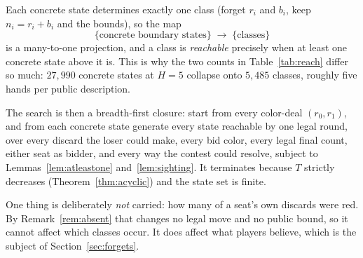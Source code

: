 \documentclass[11pt]{article}
\theoremstyle{plain}
\theoremstyle{definition}
\theoremstyle{remark}
\begin{document}
Each concrete state determines exactly one class (forget $r_i$ and $b_i$,
keep $n_i=r_i+b_i$ and the bounds), so the map
\[
  \{\text{concrete boundary states}\}\;\longrightarrow\;\{\text{classes}\}
\]
is a many-to-one projection, and a class is \emph{reachable} precisely when
at least one concrete state above it is. This is why the two counts in
Table~\ref{tab:reach} differ so much: $27{,}990$ concrete states at $H=5$
collapse onto $5{,}485$ classes, roughly five hands per public description.

The search is then a breadth-first closure: start from every color-deal
$(r_0,r_1)$, and from each concrete state generate every state reachable by
one legal round, over every discard the loser could make, every bid color,
every legal final count, either seat as bidder, and every way the contest
could resolve, subject to Lemmas~\ref{lem:atleastone}
and~\ref{lem:sighting}. It terminates because $T$ strictly decreases
(Theorem~\ref{thm:acyclic}) and the state set is finite.

One thing is deliberately \emph{not} carried: how many of a seat's own
discards were red. By Remark~\ref{rem:absent} that changes no legal move and
no public bound, so it cannot affect which classes occur. It does affect
what players believe, which is the subject of Section~\ref{sec:forgets}.
\end{document}
